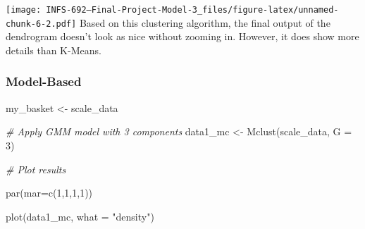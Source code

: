 \documentclass[
]{article}
\newenvironment{Shaded}{\begin{snugshade}}{\end{snugshade}}
\newcommand{\AttributeTok}[1]{\textcolor[rgb]{0.77,0.63,0.00}{#1}}
\newcommand{\CommentTok}[1]{\textcolor[rgb]{0.56,0.35,0.01}{\textit{#1}}}
\newcommand{\DecValTok}[1]{\textcolor[rgb]{0.00,0.00,0.81}{#1}}
\newcommand{\FloatTok}[1]{\textcolor[rgb]{0.00,0.00,0.81}{#1}}
\newcommand{\FunctionTok}[1]{\textcolor[rgb]{0.00,0.00,0.00}{#1}}
\newcommand{\NormalTok}[1]{#1}
\newcommand{\OtherTok}[1]{\textcolor[rgb]{0.56,0.35,0.01}{#1}}
\newcommand{\SpecialCharTok}[1]{\textcolor[rgb]{0.00,0.00,0.00}{#1}}
\newcommand{\StringTok}[1]{\textcolor[rgb]{0.31,0.60,0.02}{#1}}
\begin{document}
\begin{Shaded}
\end{Shaded}

\texttt{[image: INFS-692---Final-Project-Model-3\_files/figure-latex/unnamed-chunk-6-2.pdf]}
Based on this clustering algorithm, the final output of the dendrogram
doesn't look as nice without zooming in. However, it does show more
details than K-Means.

\hypertarget{model-based}{%
\subsubsection{Model-Based}\label{model-based}}

\begin{Shaded}
\begin{Highlighting}[]
\NormalTok{my\_basket }\OtherTok{\textless{}{-}}\NormalTok{ scale\_data}

\CommentTok{\# Apply GMM model with 3 components}
\NormalTok{data1\_mc }\OtherTok{\textless{}{-}} \FunctionTok{Mclust}\NormalTok{(scale\_data, }\AttributeTok{G =} \DecValTok{3}\NormalTok{)}

\CommentTok{\# Plot results}

\FunctionTok{par}\NormalTok{(}\AttributeTok{mar=}\FunctionTok{c}\NormalTok{(}\DecValTok{1}\NormalTok{,}\DecValTok{1}\NormalTok{,}\DecValTok{1}\NormalTok{,}\DecValTok{1}\NormalTok{))}


\FunctionTok{plot}\NormalTok{(data1\_mc, }\AttributeTok{what =} \StringTok{"density"}\NormalTok{)}
\end{Highlighting}
\end{Shaded}
\end{document}
